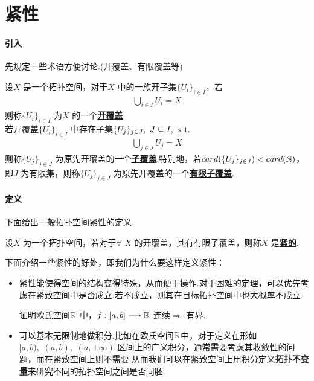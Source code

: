 \section{紧性}
\paragraph{引入}
	先规定一些术语方便讨论.(开覆盖、有限覆盖等)
	\begin{defn}\label{def 2.1.1}
		设$X$ 是一个拓扑空间，对于$X$ 中的一族开子集$\{ U_i \}_{i \in I}$，若
		\begin{align}
			\bigcup_{i \in I}{U_i} = X
		\end{align}
		则称$\{ U_i \}_{i \in I}$ 为$X$ 的一个\underline{\textbf{开覆盖}}.\\
		若开覆盖$\{ U_i \}_{i \in I}$ 中存在子集$\{ U_j \}_{j \in J} , \,\, J \subseteq I , \,\, \operatorname{s.t.}$
		\begin{align}
			\bigcup_{j \in J}{U_j} = X
		\end{align}
		则称$\{ U_j \}_{j \in J}$ 为原先开覆盖的一个\underline{\textbf{子覆盖}}.特别地，若$card(\{ U_j \}_{j \in J}) < card(\mathbb{N})$，即$J$ 为有限集，则称$\{ U_j \}_{j \in J}$ 为原先开覆盖的一个\underline{\textbf{有限子覆盖}}.
	\end{defn}

\vspace*{2em}
\paragraph{定义}
	下面给出一般拓扑空间紧性的定义.
	\begin{defn}\label{def 2.1.2}
		设$X$ 为一个拓扑空间，若对于$\forall \,\, X$ 的开覆盖，其有有限子覆盖，则称$X$ 是\underline{\textbf{紧的}}.
		\begin{rmk}
			下面介绍一些紧性的好处，即我们为什么要这样定义紧性：
			\begin{itemize}
				\item 紧性能使得空间的结构变得特殊，从而便于操作.对于困难的定理，可以优先考虑在紧致空间中是否成立.若不成立，则其在目标拓扑空间中也大概率不成立.
				\begin{example}\label{ex 2.1.1}
					证明欧氏空间$\mathbb{R}$ 中，$f : [a , b] \longrightarrow \mathbb{R}$ 连续$\Rightarrow$ 有界.
				\end{example}
			
				\item 可以基本无限制地做积分.比如在欧氏空间$\mathbb{R}$中，对于定义在形如$[a , b) , \,\, (a , b) , \,\, (a , +\infty)$ 区间上的广义积分，通常需要考虑其收敛性的问题，而在紧致空间上则不需要.从而我们可以在紧致空间上用积分定义\textbf{拓扑不变量}来研究不同的拓扑空间之间是否同胚.
			\end{itemize}
		\end{rmk}
	\end{defn}

